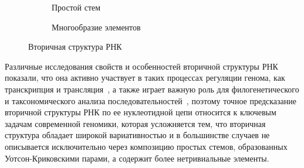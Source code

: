 \begin{figure}[h]
\centering
\begin{subfigure}{.5\textwidth}
  \centering
  \caption{Простой стем}
  \label{rna_a}
\end{subfigure}%
\begin{subfigure}{.5\textwidth}
  \centering
  \caption{Многообразие элементов}
  \label{rna_b}
\end{subfigure}
\caption{Вторичная структура РНК}
\label{rna}
\end{figure}

Различные исследования свойств и особенностей вторичной структуры РНК показали, что она активно участвует в таких процессах регуляции генома, как транскрипция и трансляция~\cite{wada1986local}, а также играет важную роль для филогенетического и таксономического анализа последовательностей~\cite{vrehakova2014variation,miladi2017rnascclust}, поэтому точное предсказание вторичной структуры РНК по ее нуклеотидной цепи относится к ключевым задачам современной геномики, которая усложняется тем, что вторичная структура обладает широкой вариативностью и в большинстве случаев не описывается исключительно через композицию простых стемов, образованных Уотсон-Криковскими парами, а содержит более нетривиальные элементы.



